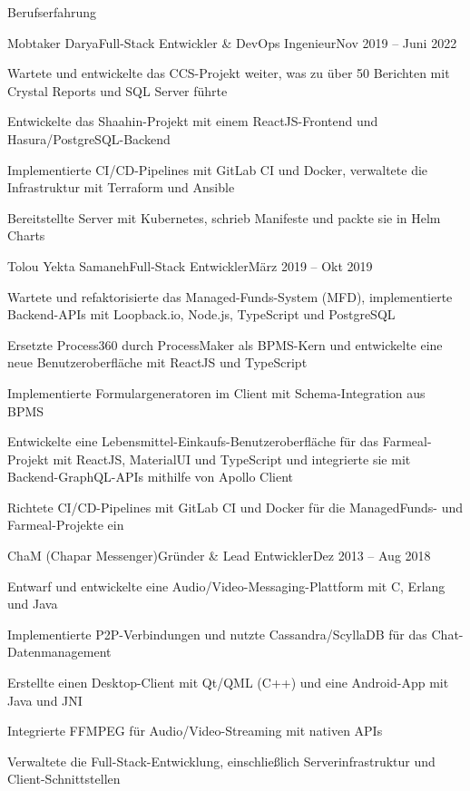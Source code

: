 \documentclass[]{main}
\begin{document}
\begin{section}{Berufserfahrung}
 \begin{subsection}{Mobtaker Darya}{Full-Stack Entwickler \& DevOps Ingenieur}{Nov 2019 -- Juni 2022}{}
     \item Wartete und entwickelte das CCS-Projekt weiter, was zu über 50 Berichten mit Crystal Reports und SQL Server führte
     \item Entwickelte das Shaahin-Projekt mit einem ReactJS-Frontend und Hasura/PostgreSQL-Backend
     \item Implementierte CI/CD-Pipelines mit GitLab CI und Docker, verwaltete die Infrastruktur mit Terraform und Ansible
     \item Bereitstellte Server mit Kubernetes, schrieb Manifeste und packte sie in Helm Charts
 \end{subsection}

 \begin{subsection}{Tolou Yekta Samaneh}{Full-Stack Entwickler}{März 2019 -- Okt 2019}{}
     \item Wartete und refaktorisierte das Managed-Funds-System (MFD), implementierte Backend-APIs mit Loopback.io, Node.js, TypeScript und PostgreSQL
     \item Ersetzte Process360 durch ProcessMaker als BPMS-Kern und entwickelte eine neue Benutzeroberfläche mit ReactJS und TypeScript
     \item Implementierte Formulargeneratoren im Client mit Schema-Integration aus BPMS
     \item Entwickelte eine Lebensmittel-Einkaufs-Benutzeroberfläche für das Farmeal-Projekt mit ReactJS, MaterialUI und TypeScript und integrierte sie mit Backend-GraphQL-APIs mithilfe von Apollo Client
     \item Richtete CI/CD-Pipelines mit GitLab CI und Docker für die ManagedFunds- und Farmeal-Projekte ein
 \end{subsection}

 \begin{subsection}{ChaM (Chapar Messenger)}{Gründer \& Lead Entwickler}{Dez 2013 -- Aug 2018}{}
     \item Entwarf und entwickelte eine Audio/Video-Messaging-Plattform mit C, Erlang und Java
     \item Implementierte P2P-Verbindungen und nutzte Cassandra/ScyllaDB für das Chat-Datenmanagement
     \item Erstellte einen Desktop-Client mit Qt/QML (C++) und eine Android-App mit Java und JNI
     \item Integrierte FFMPEG für Audio/Video-Streaming mit nativen APIs
     \item Verwaltete die Full-Stack-Entwicklung, einschließlich Serverinfrastruktur und Client-Schnittstellen
 \end{subsection}
\end{section}
\end{document}
